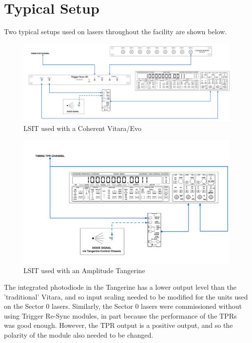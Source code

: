 \documentclass{article}
\begin{document}
\section{Typical Setup}
Two typical setups used on lasers throughout the facility are shown below.
\begin{figure}[h]
    \includegraphics[width=\textwidth]{rsc/sampleconnections.pdf}
    \caption{LSIT used with a Coherent Vitara/Evo}
\end{figure}
\begin{figure}[h]
    \includegraphics[width=\textwidth]{rsc/sampleconnections_tangerine.pdf}
    \caption{LSIT used with an Amplitude Tangerine}
\end{figure}
\begin{mdframed}[style=mystyle,frametitle=Note on Tangerines]
    The integrated photodiode in the Tangerine has a lower output level than the 'traditional' Vitara, and so input scaling needed to be modified for the units used on the Sector 0 lasers. Similarly, the Sector 0 lasers were commissioned without using Trigger Re-Sync modules, in part because the performance of the TPRs was good enough. However, the TPR output is a positive output, and so the polarity of the module also needed to be changed.
    \end{mdframed}
\end{document}

